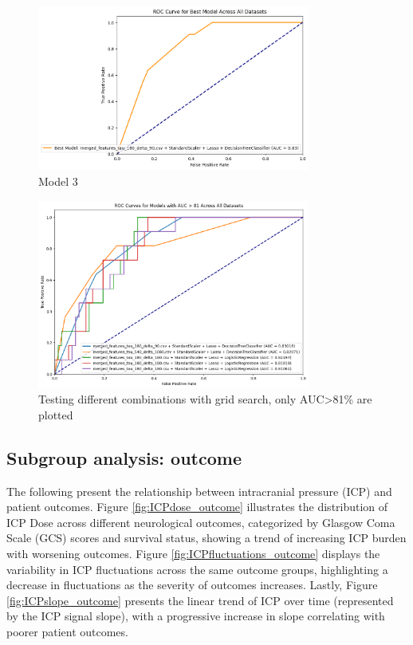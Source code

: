 \begin{figure}[h]
    \centering
    \includegraphics[width=0.8\textwidth]{pictures/fig7_model3.png}
    \caption{Model 3} %
    \label{fig:model3} %
\end{figure}
\begin{figure}
	\centering
	\includegraphics[width=0.8\textwidth]{pictures/fig8_model3tau.png}
	\caption{Testing different combinations with grid search, only AUC>81\% are plotted} %
    \label{fig:model3tau} %
\end{figure}


\subsection{Subgroup analysis: outcome}
The following present the relationship between intracranial pressure (ICP) and patient outcomes. Figure \ref{fig:ICPdose_outcome} illustrates the distribution of ICP Dose across different neurological outcomes, categorized by Glasgow Coma Scale (GCS) scores and survival status, showing a trend of increasing ICP burden with worsening outcomes. Figure \ref{fig:ICPfluctuations_outcome} displays the variability in ICP fluctuations across the same outcome groups, highlighting a decrease in fluctuations as the severity of outcomes increases. Lastly, Figure \ref{fig:ICPslope_outcome} presents the linear trend of ICP over time (represented by the ICP signal slope), with a progressive increase in slope correlating with poorer patient outcomes.

